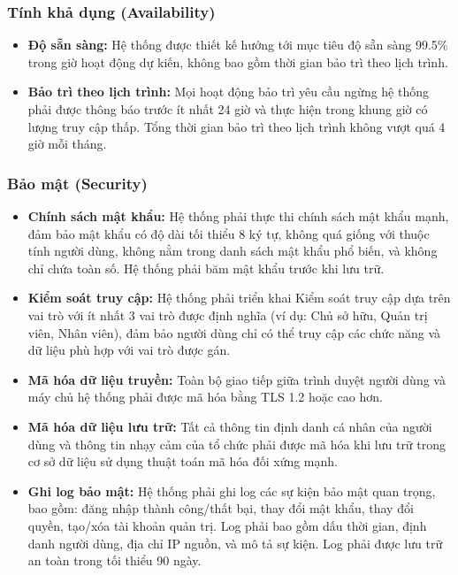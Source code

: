 \subsubsection{Tính khả dụng (Availability)}
\begin{itemize}
    \item \textbf{Độ sẵn sàng:} Hệ thống được thiết kế hướng tới mục tiêu độ sẵn sàng 99.5\% trong giờ hoạt động dự kiến, không bao gồm thời gian bảo trì theo lịch trình.    
    \item \textbf{Bảo trì theo lịch trình:} Mọi hoạt động bảo trì yêu cầu ngừng hệ thống phải được thông báo trước ít nhất 24 giờ và thực hiện trong khung giờ có lượng truy cập thấp. Tổng thời gian bảo trì theo lịch trình không vượt quá 4 giờ mỗi tháng.
\end{itemize}

\subsubsection{Bảo mật (Security)}
\begin{itemize}
    \item \textbf{Chính sách mật khẩu:} Hệ thống phải thực thi chính sách mật khẩu mạnh, đảm bảo mật khẩu có độ dài tối thiểu 8 ký tự, không quá giống với thuộc tính người dùng, không nằm trong danh sách mật khẩu phổ biến, và không chỉ chứa toàn số. Hệ thống phải băm mật khẩu trước khi lưu trữ.
    \item \textbf{Kiểm soát truy cập:} Hệ thống phải triển khai Kiểm soát truy cập dựa trên vai trò với ít nhất 3 vai trò được định nghĩa (ví dụ: Chủ sở hữu, Quản trị viên, Nhân viên), đảm bảo người dùng chỉ có thể truy cập các chức năng và dữ liệu phù hợp với vai trò được gán.
    \item \textbf{Mã hóa dữ liệu truyền:} Toàn bộ giao tiếp giữa trình duyệt người dùng và máy chủ hệ thống phải được mã hóa bằng TLS 1.2 hoặc cao hơn.
    \item \textbf{Mã hóa dữ liệu lưu trữ:} Tất cả thông tin định danh cá nhân của người dùng và thông tin nhạy cảm của tổ chức phải được mã hóa khi lưu trữ trong cơ sở dữ liệu sử dụng thuật toán mã hóa đối xứng mạnh.
    \item \textbf{Ghi log bảo mật:} Hệ thống phải ghi log các sự kiện bảo mật quan trọng, bao gồm: đăng nhập thành công/thất bại, thay đổi mật khẩu, thay đổi quyền, tạo/xóa tài khoản quản trị. Log phải bao gồm dấu thời gian, định danh người dùng, địa chỉ IP nguồn, và mô tả sự kiện. Log phải được lưu trữ an toàn trong tối thiểu 90 ngày.
\end{itemize}

